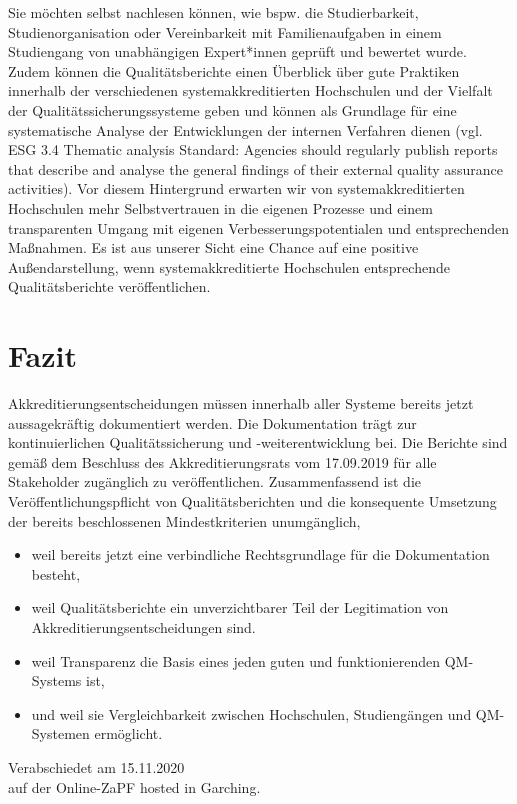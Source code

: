 \documentclass[DIV=calc]{scrartcl}
\begin{document}
Sie möchten selbst nachlesen können, wie bspw. die Studierbarkeit, Studienorganisation oder Vereinbarkeit mit Familienaufgaben in einem Studiengang von unabhängigen Expert*innen geprüft und bewertet wurde. 
Zudem können die Qualitätsberichte einen Überblick über gute Praktiken innerhalb der verschiedenen systemakkreditierten Hochschulen 
und der Vielfalt der Qualitätssicherungssysteme geben und können als Grundlage für eine systematische Analyse der Entwicklungen der internen Verfahren dienen (vgl. ESG 3.4 Thematic analysis Standard: Agencies should regularly publish reports that describe and analyse the general findings of their external quality assurance activities). 
Vor diesem Hintergrund erwarten wir von systemakkreditierten Hochschulen mehr Selbstvertrauen in die eigenen Prozesse und einem transparenten Umgang mit eigenen Verbesserungspotentialen und entsprechenden Maßnahmen. 
Es ist aus unserer Sicht eine Chance auf eine positive Außendarstellung, wenn systemakkreditierte Hochschulen entsprechende Qualitätsberichte veröffentlichen. 

\section*{Fazit}
Akkreditierungsentscheidungen müssen innerhalb aller Systeme bereits jetzt aussagekräftig dokumentiert werden. 
Die Dokumentation trägt zur kontinuierlichen Qualitätssicherung und -weiterentwicklung bei. 
Die Berichte sind gemäß dem Beschluss des Akkreditierungsrats vom 17.09.2019 für alle Stakeholder zugänglich zu veröffentlichen. 
Zusammenfassend ist die Veröffentlichungspflicht von Qualitätsberichten und die konsequente Umsetzung der bereits beschlossenen Mindestkriterien unumgänglich, 

\begin{itemize}
  \item weil bereits jetzt eine verbindliche Rechtsgrundlage für die Dokumentation besteht, 
  \item weil Qualitätsberichte ein unverzichtbarer Teil der Legitimation von Akkreditierungsentscheidungen sind.
  
  \item weil Transparenz die Basis eines jeden guten und funktionierenden QM-Systems ist, 
  \item und weil sie Vergleichbarkeit zwischen Hochschulen, Studiengängen und QM-Systemen ermöglicht.
\end{itemize}

\vfill
    \begin{flushright}
      Verabschiedet am 15.11.2020 \\auf der Online-ZaPF hosted in Garching.
    \end{flushright}
\end{document}
